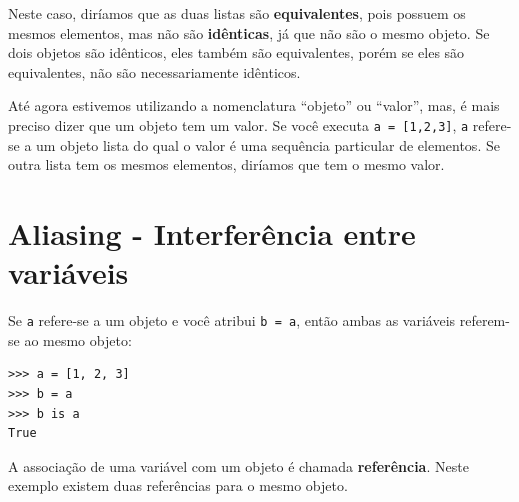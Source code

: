 Neste caso, diríamos que as duas listas são {\bf equivalentes},
pois possuem os mesmos elementos, mas não são {\bf idênticas}, já
que não são o mesmo objeto. Se dois objetos são idênticos, eles também
são equivalentes, porém se eles são equivalentes, não são necessariamente
idênticos.


Até agora estivemos utilizando a nomenclatura ``objeto'' ou ``valor'', mas, é
mais preciso dizer que um objeto tem um valor. Se você executa 
{\tt a = [1,2,3]}, {\tt a} refere-se a um objeto lista do qual o
valor é uma sequência particular de elementos. Se outra lista tem os mesmos
elementos, diríamos que tem o mesmo valor.


\section{Aliasing - Interferência entre variáveis}


Se {\tt a} refere-se a um objeto e você atribui {\tt b = a},
então ambas as variáveis referem-se ao mesmo objeto:

\beforeverb
\begin{verbatim}
>>> a = [1, 2, 3]
>>> b = a
>>> b is a
True
\end{verbatim}
\afterverb
%

A associação de uma variável com um objeto é chamada
{\bf referência}. Neste exemplo existem duas referências para o
mesmo objeto.


